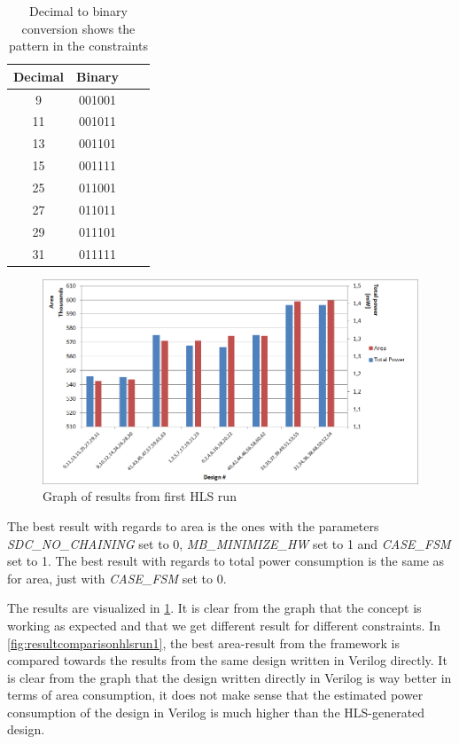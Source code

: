 \begin{table}[hbtp]
    \centering
    \begin{tabular}{cccc}
    \textbf{Decimal} & \textbf{Binary}\\
    \toprule
    9 & 001001 \\
    11 & 001011 \\
    13 & 001101 \\
    15 & 001111 \\
    25 & 011001 \\
    27 & 011011 \\
    29 & 011101 \\
    31 & 011111 \\
    \bottomrule
    \end{tabular}
    \caption{Decimal to binary conversion shows the pattern in the constraints}
    \label{tab:dectobinconstraints}
\end{table}

\begin{figure}[hbpt]
\centering
\includegraphics[width=\textwidth]{../figs/resultGraph.png}
\caption{\label{fig:resultgraphhlsrun1}Graph of results from first HLS run}
\end{figure}
The best result with regards to area is the ones with the parameters \textit{SDC\_NO\_CHAINING} set to 0, \textit{MB\_MINIMIZE\_HW} set to 1 and \textit{CASE\_FSM} set to 1. The best result with regards to total power consumption is the same as for area, just with \textit{CASE\_FSM} set to 0.

The results are visualized in \cref{fig:resultgraphhlsrun1}. It is clear from the graph that the concept is working as expected and that we get different result for different constraints. In \cref{fig:resultcomparisonhlsrun1}, the best area-result from the framework is compared towards the results from the same design written in Verilog directly. It is clear from the graph that the design written directly in Verilog is way better in terms of area consumption, it does not make sense that the estimated power consumption of the design in Verilog is much higher than the HLS-generated design.

